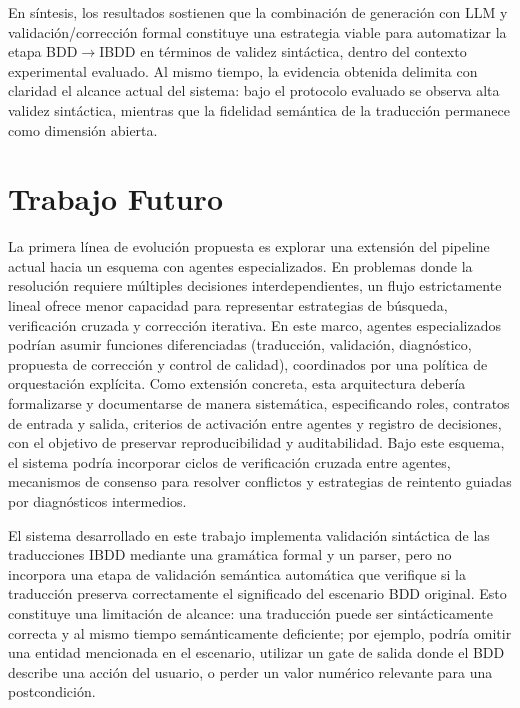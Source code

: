 En síntesis, los resultados sostienen que la combinación de generación con LLM y validación/corrección formal constituye una estrategia viable para automatizar la etapa BDD$\rightarrow$IBDD en términos de validez sintáctica, dentro del contexto experimental evaluado. Al mismo tiempo, la evidencia obtenida delimita con claridad el alcance actual del sistema: bajo el protocolo evaluado se observa alta validez sintáctica, mientras que la fidelidad semántica de la traducción permanece como dimensión abierta.

\section{Trabajo Futuro}

La primera línea de evolución propuesta es explorar una extensión del pipeline actual hacia un esquema con agentes especializados. En problemas donde la resolución requiere múltiples decisiones interdependientes, un flujo estrictamente lineal ofrece menor capacidad para representar estrategias de búsqueda, verificación cruzada y corrección iterativa. En este marco, agentes especializados podrían asumir funciones diferenciadas (traducción, validación, diagnóstico, propuesta de corrección y control de calidad), coordinados por una política de orquestación explícita. Como extensión concreta, esta arquitectura debería formalizarse y documentarse de manera sistemática, especificando roles, contratos de entrada y salida, criterios de activación entre agentes y registro de decisiones, con el objetivo de preservar reproducibilidad y auditabilidad. Bajo este esquema, el sistema podría incorporar ciclos de verificación cruzada entre agentes, mecanismos de consenso para resolver conflictos y estrategias de reintento guiadas por diagnósticos intermedios.

El sistema desarrollado en este trabajo implementa validación sintáctica de las traducciones IBDD mediante una gramática formal y un parser, pero no incorpora una etapa de validación semántica automática que verifique si la traducción preserva correctamente el significado del escenario BDD original. Esto constituye una limitación de alcance: una traducción puede ser sintácticamente correcta y al mismo tiempo semánticamente deficiente; por ejemplo, podría omitir una entidad mencionada en el escenario, utilizar un gate de salida donde el BDD describe una acción del usuario, o perder un valor numérico relevante para una postcondición.

